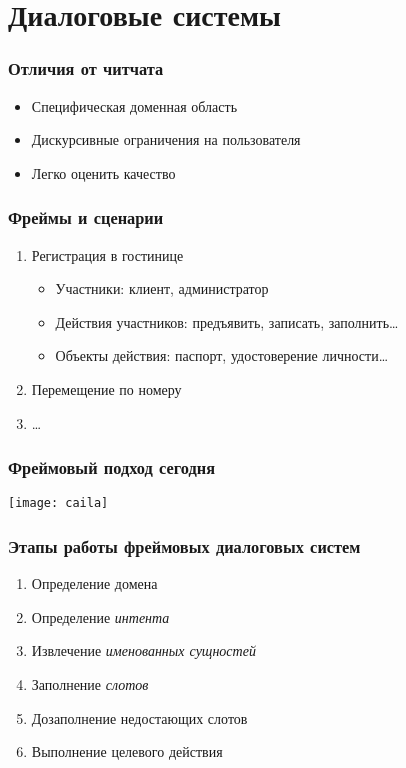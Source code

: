 \section{Диалоговые системы}

\frame{\tableofcontents[currentsection]}

\begin{frame}
    \frametitle{Отличия от читчата}

    \begin{itemize}
        \item Специфическая доменная область
        \item Дискурсивные ограничения на пользователя
        \item Легко оценить качество
    \end{itemize}
\end{frame}

\begin{frame}
    \frametitle{Фреймы и сценарии}

    \begin{enumerate}
        \item Регистрация в гостинице \begin{itemize}
            \item Участники: клиент, администратор
            \item Действия участников: предъявить, записать, заполнить\ldots
            \item Объекты действия: паспорт, удостоверение личности\ldots
        \end{itemize}
        \item Перемещение по номеру
        \item \ldots
    \end{enumerate}
\end{frame}

\begin{frame}
    \frametitle{Фреймовый подход сегодня}
    \centering
    \texttt{[image: caila]}
\end{frame}

\begin{frame}
    \frametitle{Этапы работы фреймовых диалоговых систем}

    \begin{enumerate}
        \item Определение домена
        \item Определение \textit{интента}
        \item Извлечение \textit{именованных сущностей}
        \item Заполнение \textit{слотов}
        \item Дозаполнение недостающих слотов
        \item Выполнение целевого действия
    \end{enumerate}
\end{frame}

